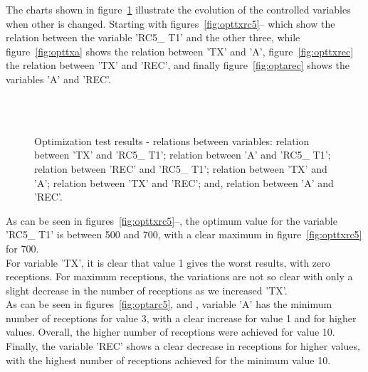 The charts shown in figure~\ref{fig:optresults2} illustrate the evolution of the controlled variables when other is changed. Starting with figures~\ref{fig:opttxrc5}-- which show the relation between the variable 'RC5\_ T1' and the other three, while figure~\ref{fig:opttxa} shows the relation between 'TX' and 'A', figure~\ref{fig:opttxrec} the relation between 'TX' and 'REC', and finally figure~\ref{fig:optarec} shows the variables 'A' and 'REC'.\\

\begin{figure}[!ht]
  \centering
  \hspace{8pt}
  \\
  \hspace{8pt}
  \\
  \hspace{8pt}
  \caption[Optimization Test Results - Relations between Variables]{Optimization test results - relations between variables:
			 relation between 'TX' and 'RC5\_ T1';
			 relation between 'A' and 'RC5\_ T1';
			 relation between 'REC' and 'RC5\_ T1';
			 relation between 'TX' and 'A';
			 relation between 'TX' and 'REC'; and,
			 relation between 'A' and 'REC'.}%
  \label{fig:optresults2}%
\end{figure}

As can be seen in figures~\ref{fig:opttxrc5}--, the optimum value for the variable 'RC5\_ T1' is between 500 and 700, with a clear maximum in figure~\ref{fig:opttxrc5} for 700.\\
For variable 'TX', it is clear that value 1 gives the worst results, with zero receptions. For maximum receptions, the variations are not so clear with only a slight decrease in the number of receptions as we increased 'TX'.\\
As can be seen in figures~\ref{fig:optarc5},  and , variable 'A' has the minimum number of receptions for value 3, with a clear increase for value 1 and for higher values. Overall, the higher number of receptions were achieved for value 10.\\
Finally, the variable 'REC' shows a clear decrease in receptions for higher values, with the highest number of receptions achieved for the minimum value 10.\\

